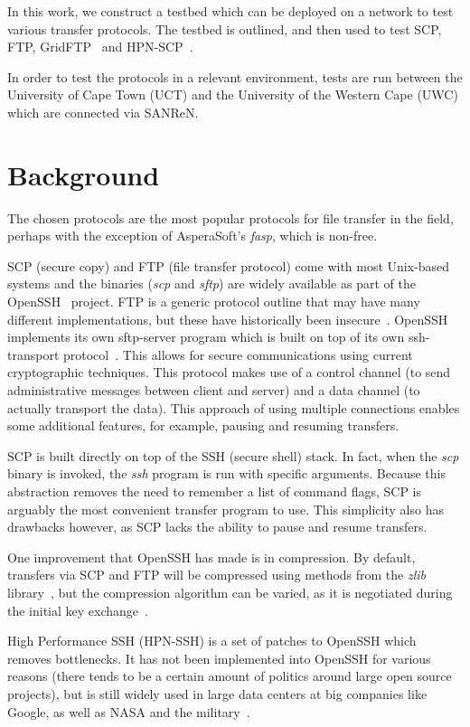 \documentclass{sig-alternate-05-2015}
\begin{document}
In this work, we construct a testbed which can be deployed on a network to test various transfer protocols. The testbed is outlined, and then used to test SCP, FTP, GridFTP~\cite{allcock2005globus} and HPN-SCP~\cite{rapier2008high}. 

In order to test the protocols in a relevant environment, tests are run between the University of Cape Town (UCT) and the University of the Western Cape (UWC) which are connected via SANReN.

\section{Background}
The chosen protocols are the most popular protocols for file transfer in the field, perhaps with the exception of AsperaSoft's \textit{fasp}, which is non-free.

SCP (secure copy) and FTP (file transfer protocol) come with most Unix-based systems and the binaries (\textit{scp} and \textit{sftp}) are widely available as part of the OpenSSH~\cite{openssh} project. FTP is a generic protocol outline that may have many different implementations, but these have historically been insecure~\cite{bonachea2001safetp}. OpenSSH implements its own sftp-server program which is built on top of its own ssh-transport protocol~\cite{venkatachalam2007openssh}. This allows for secure communications using current cryptographic techniques. This protocol makes use of a control channel (to send administrative messages between client and server) and a data channel (to actually transport the data). This approach of using multiple connections enables some additional features, for example, pausing and resuming transfers.

SCP is built directly on top of the SSH (secure shell) stack. In fact, when the \textit{scp} binary is invoked, the \textit{ssh} program is run with specific arguments. Because this abstraction removes the need to remember a list of command flags, SCP is arguably the most convenient transfer program to use. This simplicity also has drawbacks however, as SCP lacks the ability to pause and resume transfers.

One improvement that OpenSSH has made is in compression. By default, transfers via SCP and FTP will be compressed using methods from the \textit{zlib} library~\cite{gailly2004zlib}, but the compression algorithm can be varied, as it is negotiated during the initial key exchange~\cite{miller2007security}.

High Performance SSH (HPN-SSH) is a set of patches to OpenSSH which removes bottlenecks. It has not been implemented into OpenSSH for various reasons (there tends to be a certain amount of politics around large open source projects), but is still widely used in large data centers at big companies like Google, as well as NASA and the military~\cite{rapierpolitics}.
\end{document}
